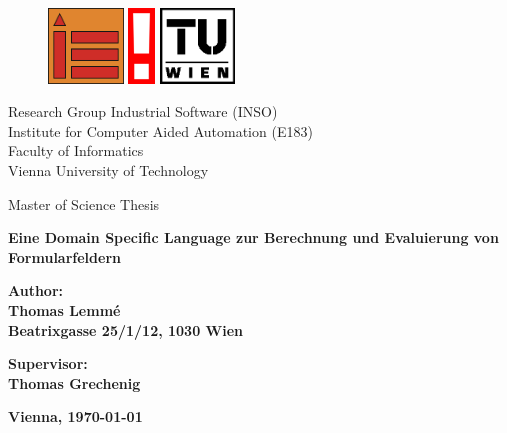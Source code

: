 \pagestyle{empty}

    	\begin{figure}[hp]
				\centering
				\includegraphics[height=20mm, clip]{figures/inso-farbe}
		 	    \hspace{1mm}
		 	    \includegraphics[height=20mm, clip]{figures/info-farbe}
		 	    \hspace{1mm}
					\includegraphics[height=20mm, clip]{figures/tu-dt-teil-schw-pos}
				\label{fig:TU-Wien}
			\end{figure} 
			
\begin{center}
    \Large
    Research Group Industrial Software (INSO)\\
    Institute for Computer Aided Automation (E183)\\
    Faculty of Informatics\\
    Vienna University of Technology\\

\end{center}

\bigskip

\begin{center}
    \Large
    \centering Master of Science Thesis
    \end{center}
    
\bigskip

\begin{center}
    \Huge\bfseries
    Eine Domain Specific Language zur Berechnung und Evaluierung von Formularfeldern
\end{center}

\bigskip
\bigskip

\begin{center}
    \Large\bfseries
    \noindent
    \centering Author: \\Thomas Lemm\'{e} \\
    Beatrixgasse 25/1/12, 1030 Wien
\end{center}
\bigskip
\begin{center}
    \Large\bfseries
    \noindent
    \centering Supervisor: \\Thomas Grechenig \\
\end{center}
\bigskip
\begin{center}
    \Large\bfseries
    \noindent
    \centering Vienna, \today
\end{center}

\vspace*{\fill}

\cleardoublepage

\rmfamily
\normalfont

